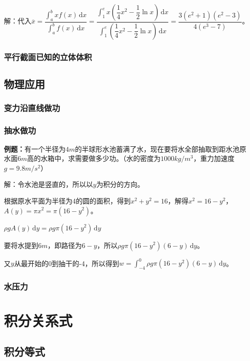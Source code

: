 \documentclass[UTF8, 12pt]{ctexart}
\begin{document}
解：代入$\overline{x}=\dfrac{\int_a^bxf(x)\,\textrm{d}x}{\int_a^bf(x)\,\textrm{d}x}=\dfrac{\int_1^ex\left(\dfrac{1}{4}x^2-\dfrac{1}{2}\ln x\right)\,\textrm{d}x}{\int_1^e\left(\dfrac{1}{4}x^2-\dfrac{1}{2}\ln x\right)\,\textrm{d}x}=\dfrac{3(e^2+1)(e^2-3)}{4(e^3-7)}$。

\subsubsection{平行截面已知的立体体积}

\subsection{物理应用}

\subsubsection{变力沿直线做功}

\subsubsection{抽水做功}

\textbf{例题：}有一个半径为$4m$的半球形水池蓄满了水，现在要将水全部抽取到距水池原水面$6m$高的水箱中，求需要做多少功。（水的密度为$1000kg/m^3$，重力加速度$g=9.8m/s^2$）

解：令水池是竖直的，所以以$y$为积分的方向。

根据原水平面为半径为4的圆的面积，得到$x^2+y^2=16$，解得$x^2=16-y^2$，$A(y)=\pi x^2=\pi(16-y^2)$。

$\rho gA(y)\,\textrm{d}y=\rho g\pi(16-y^2)\,\textrm{d}y$

要将水提到$6m$，即路径为$6-y$，所以$\rho g\pi(16-y^2)(6-y)\,\textrm{d}y$。

又$y$从最开始的0到抽干的-4，所以得到$w=\int_{-4}^0\rho g\pi(16-y^2)(6-y)\,\textrm{d}y$。

\subsubsection{水压力}

\section{积分关系式}

\subsection{积分等式}
\end{document}
